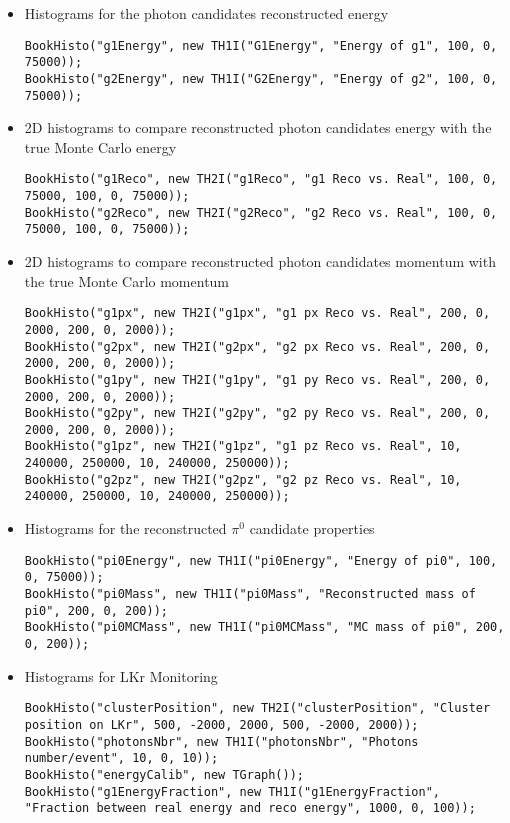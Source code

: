 \begin{itemize}
  \item Histograms for the photon candidates reconstructed energy 
\begin{lstlisting}
BookHisto("g1Energy", new TH1I("G1Energy", "Energy of g1", 100, 0, 75000));
BookHisto("g2Energy", new TH1I("G2Energy", "Energy of g2", 100, 0, 75000));
\end{lstlisting}
	\item 2D histograms to compare reconstructed photon candidates energy with the true Monte Carlo
	energy
\begin{lstlisting}
BookHisto("g1Reco", new TH2I("g1Reco", "g1 Reco vs. Real", 100, 0, 75000, 100, 0, 75000));
BookHisto("g2Reco", new TH2I("g2Reco", "g2 Reco vs. Real", 100, 0, 75000, 100, 0, 75000));
\end{lstlisting}
	\item 2D histograms to compare reconstructed photon candidates momentum with the true Monte Carlo
	momentum
\begin{lstlisting}
BookHisto("g1px", new TH2I("g1px", "g1 px Reco vs. Real", 200, 0, 2000, 200, 0, 2000));
BookHisto("g2px", new TH2I("g2px", "g2 px Reco vs. Real", 200, 0, 2000, 200, 0, 2000));
BookHisto("g1py", new TH2I("g1py", "g1 py Reco vs. Real", 200, 0, 2000, 200, 0, 2000));
BookHisto("g2py", new TH2I("g2py", "g2 py Reco vs. Real", 200, 0, 2000, 200, 0, 2000));
BookHisto("g1pz", new TH2I("g1pz", "g1 pz Reco vs. Real", 10, 240000, 250000, 10, 240000, 250000));
BookHisto("g2pz", new TH2I("g2pz", "g2 pz Reco vs. Real", 10, 240000, 250000, 10, 240000, 250000));
\end{lstlisting}
	\item Histograms for the reconstructed $\pi^0$ candidate properties
\begin{lstlisting}
BookHisto("pi0Energy", new TH1I("pi0Energy", "Energy of pi0", 100, 0, 75000));
BookHisto("pi0Mass", new TH1I("pi0Mass", "Reconstructed mass of pi0", 200, 0, 200));
BookHisto("pi0MCMass", new TH1I("pi0MCMass", "MC mass of pi0", 200, 0, 200));
\end{lstlisting}
	\item Histograms for LKr Monitoring
\begin{lstlisting}
BookHisto("clusterPosition", new TH2I("clusterPosition", "Cluster position on LKr", 500, -2000, 2000, 500, -2000, 2000));
BookHisto("photonsNbr", new TH1I("photonsNbr", "Photons number/event", 10, 0, 10));
BookHisto("energyCalib", new TGraph());
BookHisto("g1EnergyFraction", new TH1I("g1EnergyFraction", "Fraction between real energy and reco energy", 1000, 0, 100));

\end{lstlisting}
\end{itemize}
